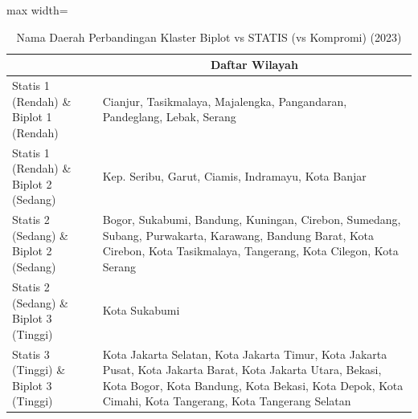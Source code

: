 \begin{table}[H]
\centering
\caption{Nama Daerah Perbandingan Klaster Biplot vs STATIS (vs Kompromi) (2023)} \label{tab:app1biplot_statis_name_2023}
\begin{adjustbox}{max width=\textwidth}
\begin{tabular}{|>{\centering\arraybackslash}p{4cm}|p{10cm}|}
\hline
\multicolumn{1}{|c|}{\textbf{Kategori}} & \multicolumn{1}{c|}{\textbf{Daftar Wilayah}} \\
\hline
Statis 1 (Rendah) \& Biplot 1 (Rendah) & Cianjur, Tasikmalaya, Majalengka, Pangandaran, Pandeglang, Lebak, Serang \\
\hline
Statis 1 (Rendah) \& Biplot 2 (Sedang) & Kep. Seribu, Garut, Ciamis, Indramayu, Kota Banjar \\
\hline
Statis 2 (Sedang) \& Biplot 2 (Sedang) & Bogor, Sukabumi, Bandung, Kuningan, Cirebon, Sumedang, Subang, Purwakarta, Karawang, Bandung Barat, Kota Cirebon, Kota Tasikmalaya, Tangerang, Kota Cilegon, Kota Serang \\
\hline
Statis 2 (Sedang) \& Biplot 3 (Tinggi) & Kota Sukabumi \\
\hline
Statis 3 (Tinggi) \& Biplot 3 (Tinggi) & Kota Jakarta Selatan, Kota Jakarta Timur, Kota Jakarta Pusat, Kota Jakarta Barat, Kota Jakarta Utara, Bekasi, Kota Bogor, Kota Bandung, Kota Bekasi, Kota Depok, Kota Cimahi, Kota Tangerang, Kota Tangerang Selatan \\
\hline
\end{tabular}
\end{adjustbox}
\end{table}